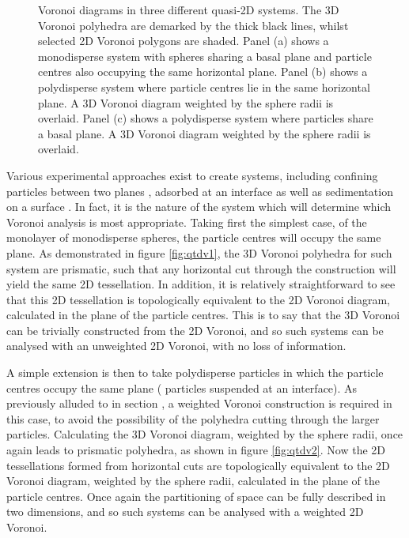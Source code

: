 \begin{figure}[tb]
	
	\caption{Voronoi diagrams in three different quasi\--2D systems. The 3D Voronoi polyhedra are demarked by the thick black lines, whilst selected 2D Voronoi polygons are shaded. Panel (a) shows a monodisperse system with spheres sharing a basal plane and particle centres also occupying the same horizontal plane. Panel (b) shows a polydisperse system where particle centres lie in the same horizontal plane. A 3D Voronoi diagram weighted by the sphere radii is overlaid. Panel (c) shows a polydisperse system where particles share a basal plane. A 3D Voronoi diagram weighted by the sphere radii is overlaid.}
	\label{fig:qtdv}
\end{figure}

Various experimental approaches exist to create \qtd{} systems, including confining particles between two planes \cite{Marcus1997,Weikai2014}, adsorbed at an interface \cite{Peng2009,Vogel2014} as well as sedimentation on a surface \cite{Tamborini2015,Thorneywork2018}.
In fact, it is the nature of the system which will determine which Voronoi analysis is most appropriate.
Taking first the simplest \qtd{} case, of the monolayer of monodisperse spheres, the particle centres will occupy the same plane.
As demonstrated in figure \ref{fig:qtdv1}, the 3D Voronoi polyhedra for such system are prismatic, such that any horizontal cut through the construction will yield the same 2D tessellation. 
In addition, it is relatively straightforward to see that this 2D tessellation is topologically equivalent to the 2D Voronoi diagram, calculated in the plane of the particle centres.
This is to say that the 3D Voronoi can be trivially constructed from the 2D Voronoi, and so such systems can be analysed with an unweighted 2D Voronoi, with no loss of information.

A simple extension is then to take polydisperse particles in which the particle centres occupy the same plane (\eg{} particles suspended at an interface).
As previously alluded to in section , a weighted Voronoi construction is required in this case, to avoid the possibility of the polyhedra cutting through the larger particles.
Calculating the 3D Voronoi diagram, weighted by the sphere radii, once again leads to prismatic polyhedra, as shown in figure \ref{fig:qtdv2}.
Now the 2D tessellations formed from horizontal cuts are topologically equivalent to the 2D Voronoi diagram, weighted by the sphere radii, calculated in the plane of the particle centres.
Once again the partitioning of space can be fully described in two dimensions, and so such systems can be analysed with a weighted 2D Voronoi.

